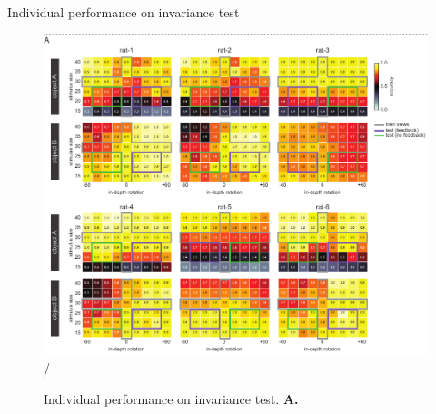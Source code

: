 Individual performance on invariance test
\begin{figure}[t!]
\includegraphics[width=\textwidth]{figures/supplemental/fig_s3_heatmaps_per_rat/fig_s3_heatmaps_per_rat.pdf}/
    \vspace{.1in}
    \caption[Individual invariance performance]{Individual performance on invariance test.
    \textbf{A.} 
    \label{supfig:heatmaps}}
\end{figure}

